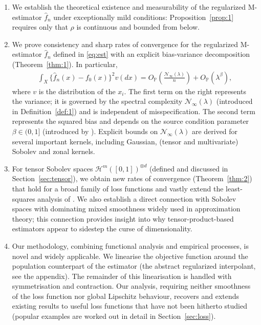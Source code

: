 \documentclass[11pt]{article}
\theoremstyle{definition}
\theoremstyle{remark}
\begin{document}
\begin{enumerate}
\item We establish the theoretical existence and measurability of the regularized M-estimator $\widehat{f}_n$ under exceptionally mild conditions: Proposition~\ref{prop:1} requires only that $\rho$ is continuous and bounded from below.

\item We prove consistency and sharp rates of convergence for the regularized M-estimator $\widehat{f}_n$ defined in \eqref{eq:est} with an explicit bias-variance decomposition (Theorem~\ref{thm:1}). In particular,
  \begin{align*}
\int_X \{\widehat{f}_n(x) - f_0(x)\}^2 v(dx) = O_\mathbb{P}\left( \frac{\mathcal{N}_\infty(\lambda)}{n} \right) + O_\mathbb{P}(\lambda^\beta),
 \end{align*}
where $v$ is the distribution of the $x_i$. The first term on the right represents the variance; it is governed by the spectral complexity $\mathcal{N}_\infty(\lambda)$ (introduced in Definition~\ref{def:1}) and is independent of misspecification. The second term represents the squared bias and depends on the source condition parameter $\beta \in (0,1]$ (introduced by \citet{St:2012}). Explicit bounds on $\mathcal{N}_\infty(\lambda)$ are derived for several important kernels, including Gaussian, (tensor and multivariate) Sobolev and zonal kernels. 

\item For tensor Sobolev spaces $\mathcal{H}^m([0,1])^{\otimes d}$ (defined and discussed in Section~\ref{sec:tensor}), we obtain new rates of convergence (Theorem~\ref{thm:2}) that hold for a broad family of loss functions and vastly extend the least-squares analysis of \citet{Lin:2000}. We also establish a direct connection with Sobolev spaces with dominating mixed smoothness widely used in approximation theory; this connection provides insight into why tensor-product-based estimators appear to sidestep the curse of dimensionality.

\item Our methodology, combining functional analysis and empirical processes, is novel and widely applicable. We linearise the objective function around the population counterpart of the estimator (the abstract regularized interpolant, see the appendix). The remainder of this linearisation is handled with symmetrisation and contraction. Our analysis, requiring neither smoothness of the loss function nor global Lipschitz behaviour, recovers and extends existing results to useful loss functions that have not been hitherto studied (popular examples are worked out in detail in Section~\ref{sec:loss}).

\end{enumerate}
\end{document}
